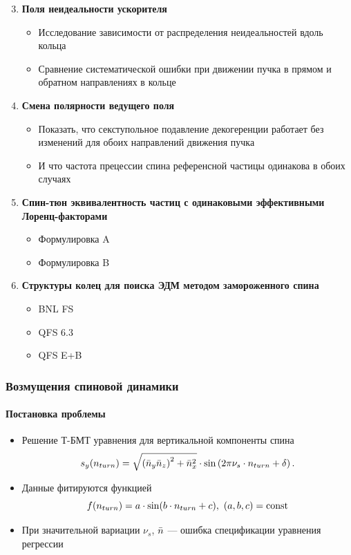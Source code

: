 \documentclass[14pt]{beamer}
\newcommand{\ntrn}{n_{turn}}
\begin{document}
\begin{frame}
	\begin{enumerate}[<+->]	\setcounter{enumi}{2}
		\item \textbf{Поля неидеальности ускорителя}
		\begin{itemize}
			\item Исследование зависимости от распределения неидеальностей вдоль кольца
			\item Сравнение систематической ошибки при движении пучка в прямом и обратном направлениях в кольце
		\end{itemize}
		\item \textbf{Смена полярности ведущего поля}
		\begin{itemize}
			\item Показать, что секступольное подавление декогеренции работает без изменений для обоих направлений движения пучка
			\item И что частота прецессии спина референсной частицы одинакова в обоих случаях
		\end{itemize}
	\end{enumerate}
\end{frame}
\begin{frame}
	\begin{enumerate}[<+->]  \setcounter{enumi}{4}
		\item \textbf{Спин-тюн эквивалентность частиц с одинаковыми эффективными Лоренц-факторами}
		\begin{itemize}[<.->]
			\item Формулировка A
			\item Формулировка B
		\end{itemize}
		\item \textbf{Структуры колец для поиска ЭДМ методом замороженного спина}
		\begin{itemize}[<.->]
			\item BNL FS
			\item QFS 6.3
			\item QFS E+B
		\end{itemize}
	\end{enumerate}
\end{frame}
\begin{frame}\frametitle{Возмущения спиновой динамики}
	\framesubtitle{Постановка проблемы}
	\begin{itemize}[<+->]
		\item Решение Т-БМТ уравнения для вертикальной компоненты спина
		\[
		s_y(n_{turn}) = \sqrt{\bkt{\nbar_y\nbar_z}^2 + \nbar_x^2}\cdot\sin\bkt{2\pi\nu_s\cdot\ntrn + \delta}.
		\]
		\item Данные фитируются функцией
		\[
		f(\ntrn) = a\cdot \sin(b\cdot \ntrn + c), ~(a,b,c)=\const
		\]
		\item При значительной вариации $\nu_s$, $\bar n$ --- ошибка спецификации уравнения регрессии
	\end{itemize}
\end{frame}
\end{document}

